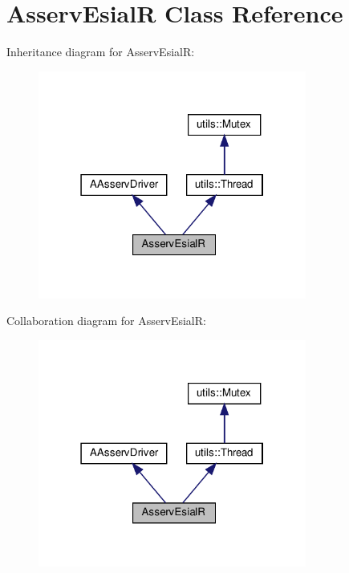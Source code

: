 \hypertarget{classAsservEsialR}{}\section{Asserv\+EsialR Class Reference}
\label{classAsservEsialR}


Inheritance diagram for Asserv\+EsialR\+:
\nopagebreak
\begin{figure}[H]
\begin{center}
\leavevmode
\includegraphics[width=250pt]{classAsservEsialR__inherit__graph}
\end{center}
\end{figure}


Collaboration diagram for Asserv\+EsialR\+:
\nopagebreak
\begin{figure}[H]
\begin{center}
\leavevmode
\includegraphics[width=250pt]{classAsservEsialR__coll__graph}
\end{center}
\end{figure}
